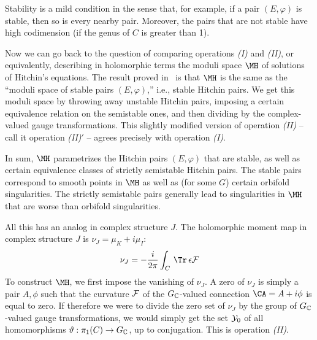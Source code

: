 Stability is a mild condition in the sense that, for example, if a
pair $(E,\varphi)$ is stable, then so is every nearby pair.
Moreover, the pairs that are not stable have high codimension (if
the genus of $C$ is greater than 1).

Now we can go back to the question of comparing operations {\it
(I)} and {\it (II)}, or equivalently, describing in holomorphic
terms the moduli space $\MH$ of solutions of Hitchin's equations.
The result proved in \cite{ref20}\ is that $\MH$ is the same as the
``moduli space of stable pairs $(E,\varphi)$,'' i.e., stable
Hitchin pairs. We get this moduli space by throwing away unstable
Hitchin pairs, imposing a certain equivalence relation on the
semistable ones, and then dividing by the complex-valued gauge
transformations.  This slightly modified   version of operation
{\it (II)} -- call it operation {\it (II)$'$} -- agrees precisely
with operation {\it (I)}.

In sum, $\MH$ parametrizes the Hitchin pairs $(E,\varphi)$ that
are stable, as well as certain equivalence classes of strictly
semistable Hitchin pairs.  The stable pairs correspond to smooth
points in $\MH$ as well as (for some $G$) certain orbifold
singularities. The strictly semistable pairs generally lead to
singularities in $\MH$ that are worse than orbifold singularities.

\par{}

All this has an analog in complex structure $J$. The holomorphic
moment map in complex structure $J$ is $\nu_J=\mu_K+i\mu_I$:
\setcounter{equation}{20}
\begin{equation}\label{eq:nuJ}
\nu_J =-{i\over 2\pi}\int_C\,\Tr\,\epsilon{\cal F}
\end{equation}
 To
construct $\MH$, we first impose the vanishing of $\nu_J$. A zero
of $\nu_J$ is simply a pair $A,\phi$ such that the curvature
${\cal F}$ of the $G_{\Bbb{C}}$-valued connection $\CA=A+i\phi$ is
equal to zero. If therefore we were to divide the zero set of
$\nu_J$ by the group of $G_{\Bbb{C}}$-valued gauge
transformations, we would simply get the set ${\cal Y}_0$ of all
homomorphisms $\vartheta:\pi_1(C)\to G_{\Bbb{C}}$, up to
conjugation. This is operation {\it (II)}.


